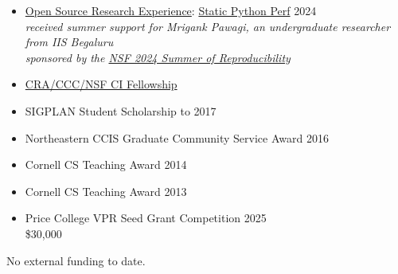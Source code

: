\documentclass[11pt]{article}
\begin{document}

\begin{itemize}
  \item \href{https://ucsc-ospo.github.io/osre24/}{Open Source Research Experience}: \href{https://ucsc-ospo.github.io/project/osre24/uutah/static-python-perf/}{Static Python Perf} \hfill 2024
    \\ \emph{received summer support for Mrigank Pawagi, an undergraduate researcher from IIS Begaluru}
    \\ \emph{sponsored by the \href{https://www.nsf.gov/awardsearch/showAward?AWD_ID=2226407&HistoricalAwards=false}{NSF 2024 Summer of Reproducibility}}
  \item \href{https://cifellows2020.org}{CRA/CCC/NSF CI Fellowship} \hfill {}
  \item {SIGPLAN Student Scholarship to \turing{}} \hfill 2017
  \item Northeastern CCIS Graduate Community Service Award \hfill 2016
  \item Cornell CS Teaching Award \hfill 2014
  \item Cornell CS Teaching Award \hfill 2013
\end{itemize}



\begin{itemize}
  \item Price College VPR Seed Grant Competition \hfill 2025
    \\ \$30,000
\end{itemize}

No external funding to date.

\end{document}

